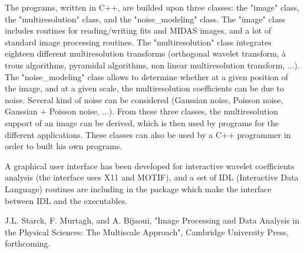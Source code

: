 The programs, written in C++, are builded upon three classes: the  
"image" class, the "multiresolution" class, and the "noise\_modeling" class.
The "image" class includes routines for reading/writing fits and MIDAS
images, and a lot of standard image processing routines. The "multiresolution"
class integrates eighteen different multiresolution transforms 
(orthogonal wavelet transform, \`a trous algorithms, pyramidal algorithms,
non linear multiresolution transform, ...). The "noise\_modeling" class
allows to determine whether at a given position of the image, 
and at a given scale, the multiresolution coefficients can be due to noise.
Several kind of noise can be considered (Gaussian noise, Poisson noise, 
Gaussian + Poisson noise, ...). From these three classes, the multiresolution
support of an image can be derived, which is then used by programs 
for the different applications. These classes can also
be used by a C++ programmer in order to built his own programs.

A graphical user interface has been developed for interactive 
wavelet coefficients analysis (the interface uses X11 and MOTIF), 
and a set of IDL (Interactive Data Language) routines
are including in the package which make the interface between IDL and 
the executables. 

\begin{thebibliography}{99}
 J.L. Starck, F. Murtagh, and A. Bijaoui,  "Image Processing
 and Data Analysis in the Physical Sciences: The
        Multiscale Approach",  Cambridge University Press, forthcoming.
\end{thebibliography}




